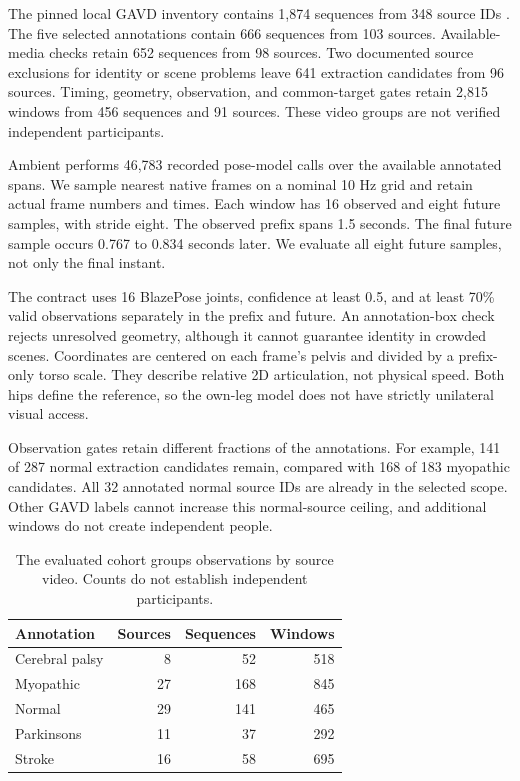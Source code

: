 \documentclass[letterpaper]{article}
\begin{document}
The pinned local GAVD inventory contains 1,874 sequences from 348 source IDs \citep{ranjan2025}. The five selected annotations contain 666 sequences from 103 sources. Available-media checks retain 652 sequences from 98 sources. Two documented source exclusions for identity or scene problems leave 641 extraction candidates from 96 sources. Timing, geometry, observation, and common-target gates retain 2,815 windows from 456 sequences and 91 sources. These video groups are not verified independent participants.

Ambient performs 46,783 recorded pose-model calls over the available annotated spans. We sample nearest native frames on a nominal 10 Hz grid and retain actual frame numbers and times. Each window has 16 observed and eight future samples, with stride eight. The observed prefix spans 1.5 seconds. The final future sample occurs 0.767 to 0.834 seconds later. We evaluate all eight future samples, not only the final instant.

The contract uses 16 BlazePose joints, confidence at least 0.5, and at least 70\% valid observations separately in the prefix and future. An annotation-box check rejects unresolved geometry, although it cannot guarantee identity in crowded scenes. Coordinates are centered on each frame's pelvis and divided by a prefix-only torso scale. They describe relative 2D articulation, not physical speed. Both hips define the reference, so the own-leg model does not have strictly unilateral visual access.

Observation gates retain different fractions of the annotations. For example, 141 of 287 normal extraction candidates remain, compared with 168 of 183 myopathic candidates. All 32 annotated normal source IDs are already in the selected scope. Other GAVD labels cannot increase this normal-source ceiling, and additional windows do not create independent people.

\begin{table}[t]
\centering
\small
\begin{tabular}{lrrr}
\toprule
Annotation & Sources & Sequences & Windows \\
\midrule
Cerebral palsy & 8 & 52 & 518 \\
Myopathic & 27 & 168 & 845 \\
Normal & 29 & 141 & 465 \\
Parkinsons & 11 & 37 & 292 \\
Stroke & 16 & 58 & 695 \\
\bottomrule
\end{tabular}
\caption{The evaluated cohort groups observations by source video. Counts do not establish independent participants.}
\end{table}
\end{document}
